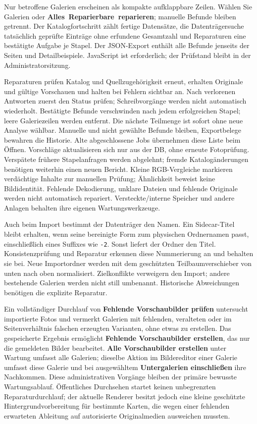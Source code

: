 \documentclass[11pt,a4paper]{article}
\newcommand{\ui}[1]{\textbf{#1}}
\newcommand{\codeword}[1]{\nolinkurl{#1}}
\begin{document}
Nur betroffene Galerien erscheinen als kompakte aufklappbare Zeilen. Wählen
Sie Galerien oder \ui{Alles~Reparierbare~reparieren}; manuelle Befunde bleiben
getrennt. Der Katalogfortschritt zählt fertige Datensätze, die
Datenträgersuche tatsächlich geprüfte Einträge ohne erfundene Gesamtzahl und
Reparaturen eine bestätigte Aufgabe je Stapel. Der JSON-Export enthält alle
Befunde jenseits der Seiten und Detailbeispiele. JavaScript ist erforderlich;
der Prüfstand bleibt in der Administratorsitzung.

Reparaturen prüfen Katalog und Quellzugehörigkeit erneut, erhalten Originale
und gültige Vorschauen und halten bei Fehlern sichtbar an. Nach verlorenen
Antworten zuerst den Status prüfen; Schreibvorgänge werden nicht automatisch
wiederholt. Bestätigte Befunde verschwinden nach jedem erfolgreichen Stapel;
leere Galeriezeilen werden entfernt. Die nächste Teilmenge ist sofort ohne neue
Analyse wählbar. Manuelle und nicht gewählte Befunde bleiben, Exportbelege
bewahren die Historie. Alte abgeschlossene Jobs übernehmen diese Liste beim
Öffnen. Vorschläge aktualisieren sich nur aus der DB, ohne erneute Fotoprüfung.
Verspätete frühere Stapelanfragen werden abgelehnt; fremde Katalogänderungen
benötigen weiterhin einen neuen Bericht. Kleine RGB-Vergleiche markieren
verdächtige Inhalte zur manuellen Prüfung; Ähnlichkeit beweist keine
Bildidentität. Fehlende Dekodierung, unklare Dateien und fehlende Originale
werden nicht automatisch repariert. Versteckte/interne Speicher und andere
Anlagen behalten ihre eigenen Wartungswerkzeuge.

Auch beim Import bestimmt der Datenträger den Namen. Ein Sidecar-Titel bleibt
erhalten, wenn seine bereinigte Form zum physischen Ordnernamen passt,
einschließlich eines Suffixes wie \codeword{-2}. Sonst liefert der Ordner den
Titel. Konsistenzprüfung und Reparatur erkennen diese Nummerierung an und
behalten sie bei. Neue Importordner werden mit dem
geschützten Teilbaumverschieber von unten nach oben normalisiert.
Zielkonflikte verweigern den Import; andere bestehende Galerien werden nicht
still umbenannt. Historische Abweichungen benötigen die explizite Reparatur.

Ein vollständiger Durchlauf von \ui{Fehlende Vorschaubilder prüfen} untersucht
importierte Fotos und vermerkt Galerien mit fehlenden, veralteten oder im
Seitenverhältnis falschen erzeugten Varianten, ohne etwas zu erstellen. Das
gespeicherte Ergebnis ermöglicht \ui{Fehlende Vorschaubilder erstellen}, das
nur die gemeldeten Bilder bearbeitet. \ui{Alle Vorschaubilder erstellen} unter
Wartung umfasst alle Galerien; dieselbe Aktion im Bildereditor einer Galerie
umfasst diese Galerie und bei ausgewähltem \ui{Untergalerien einschließen}
ihre Nachkommen. Diese administrativen Vorgänge bleiben der primäre bewusste
Wartungsablauf. Öffentliches Durchsehen startet keinen unbegrenzten
Reparaturdurchlauf; der aktuelle Renderer besitzt jedoch eine kleine
geschützte Hintergrundvorbereitung für bestimmte Karten, die wegen einer
fehlenden erwarteten Ableitung auf autorisierte Originalmedien ausweichen
mussten.
\end{document}
